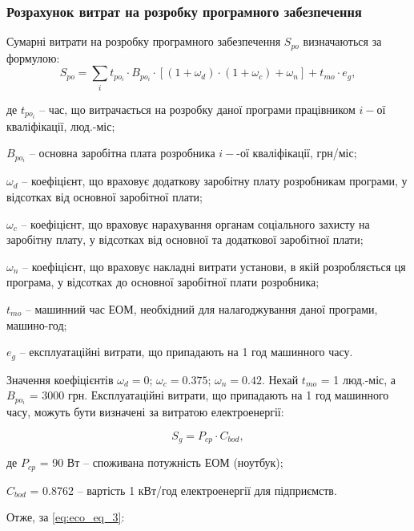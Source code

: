 \subsubsection{Розрахунок витрат на розробку програмного забезпечення}
Сумарні витрати на розробку програмного забезпечення $S_{po}$ визначаються за формулою:
\begin{equation}
	S_{po} = \sum_{i}t_{po_{i}}\cdot{B_{po_{i}}}\cdot{[(1+\omega_{d})\cdot{(1+\omega_{c})}+\omega_{n}]}+t_{mo}\cdot{e_{g}},
\end{equation}
\par де $t_{po_{i}}$ -- час, що витрачається на розробку даної програми працівником $i-$ої кваліфікації, люд.-міс;
\par $B_{po_{i}}$ -- основна заробітна плата розробника $i-$-ої кваліфікації, грн/міс;
\par $\omega_{d}$ -- коефіцієнт, що враховує додаткову заробітну плату розробникам програми, у відсотках від основної заробітної плати;
\par $\omega_{c}$ -- коефіцієнт, що враховує нарахування органам соціального захисту на заробітну плату, у відсотках від основної та додаткової заробітної плати;
\par $\omega_{n}$ -- коефіцієнт, що враховує накладні витрати установи, в якій розробляється ця програма, у відсотках до основної заробітної плати розробника;
\par $t_{mo}$ -- машинний час ЕОМ, необхідний для налагоджування даної програми, машино-год;
\par $e_{g}$ -- експлуатаційні витрати, що припадають на 1 год машинного часу.

\par Значення коефіцієнтів $\omega_{d}=0$; $\omega_{c}=0.375$; $\omega_{n}=0.42$. Нехай $t_{mo}$ = 1 люд.-міс, а $B_{po_{i}}$ = 3000 грн. Експлуатаційні витрати, що припадають на 1 год машинного часу, можуть бути визначені за витратою електроенергії:

\begin{equation}\label{eq:eco_eq_3}
	S_{g} = P_{cp}\cdot{C_{bod}},
\end{equation}
\par де $P_{cp}$ = 90 Вт -- споживана потужність ЕОМ (ноутбук);
\par $C_{bod}$ = 0.8762 -- вартість 1 кВт/год електроенергії для підприємств.

\par Отже, за \eqref{eq:eco_eq_3}:
\begin{center}
\end{center}

